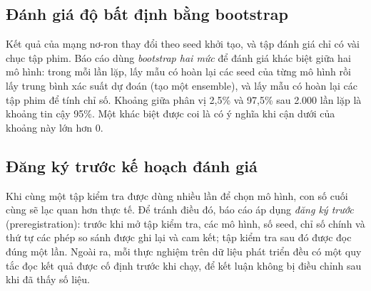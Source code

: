\subsection{Đánh giá độ bất định bằng bootstrap}

Kết quả của mạng nơ-ron thay đổi theo seed khởi tạo, và tập đánh giá chỉ có vài chục tập phim. Báo cáo dùng \emph{bootstrap hai mức} để đánh giá khác biệt giữa hai mô hình: trong mỗi lần lặp, lấy mẫu có hoàn lại các seed của từng mô hình rồi lấy trung bình xác suất dự đoán (tạo một ensemble), và lấy mẫu có hoàn lại các tập phim để tính chỉ số. Khoảng giữa phân vị 2,5\% và 97,5\% sau 2.000 lần lặp là khoảng tin cậy 95\%. Một khác biệt được coi là có ý nghĩa khi cận dưới của khoảng này lớn hơn 0.

\subsection{Đăng ký trước kế hoạch đánh giá}

Khi cùng một tập kiểm tra được dùng nhiều lần để chọn mô hình, con số cuối cùng sẽ lạc quan hơn thực tế. Để tránh điều đó, báo cáo áp dụng \emph{đăng ký trước} (preregistration): trước khi mở tập kiểm tra, các mô hình, số seed, chỉ số chính và thứ tự các phép so sánh được ghi lại và cam kết; tập kiểm tra sau đó được đọc đúng một lần. Ngoài ra, mỗi thực nghiệm trên dữ liệu phát triển đều có một quy tắc đọc kết quả được cố định trước khi chạy, để kết luận không bị điều chỉnh sau khi đã thấy số liệu.
